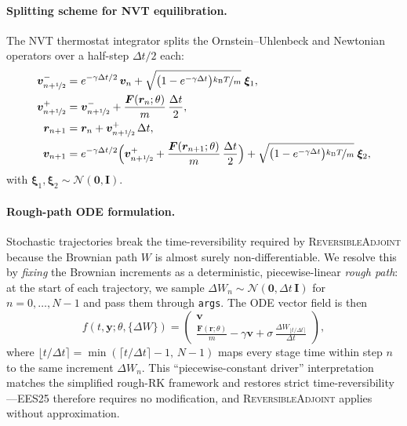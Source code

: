 \documentclass{article}
\newcommand{\kB}{k_{\mathrm{B}}}
\newcommand{\EES}{\textsc{EES25}}
\newcommand{\RevAdj}{\textsc{ReversibleAdjoint}}
\begin{document}
\paragraph{Splitting scheme for NVT equilibration.}
The NVT thermostat integrator splits the Ornstein--Uhlenbeck and Newtonian
operators over a half-step $\Delta t/2$ each:
\begin{align}
  \bm{v}_{n+\nicefrac{1}{2}}^- &= e^{-\gamma\Delta t/2}\,\bm{v}_n
    + \sqrt{\bigl(1-e^{-\gamma\Delta t}\bigr)\nicefrac{\kB T}{m}}\;\bm{\xi}_1, \\
  \bm{v}_{n+\nicefrac{1}{2}}^+ &= \bm{v}_{n+\nicefrac{1}{2}}^-
    + \frac{\bm{F}(\bm{r}_n;\theta)}{m}\,\frac{\Delta t}{2}, \\
  \bm{r}_{n+1} &= \bm{r}_n + \bm{v}_{n+\nicefrac{1}{2}}^+\,\Delta t, \\
  \bm{v}_{n+1} &= e^{-\gamma\Delta t/2}\Bigl(\bm{v}_{n+\nicefrac{1}{2}}^+
    + \frac{\bm{F}(\bm{r}_{n+1};\theta)}{m}\,\frac{\Delta t}{2}\Bigr)
    + \sqrt{\bigl(1-e^{-\gamma\Delta t}\bigr)\nicefrac{\kB T}{m}}\;\bm{\xi}_2,
\end{align}
with $\bm{\xi}_1, \bm{\xi}_2 \sim \mathcal{N}(\bm{0},\bm{I})$.

\paragraph{Rough-path ODE formulation.}
Stochastic trajectories break the time-reversibility required by \RevAdj{}
because the Brownian path $W$ is almost surely non-differentiable.  We resolve
this by \emph{fixing} the Brownian increments as a deterministic, piecewise-linear
\emph{rough path}: at the start of each trajectory, we sample
$\Delta W_n \sim \mathcal{N}(\bm{0}, \Delta t\,\bm{I})$ for
$n = 0, \ldots, N-1$ and pass them through \texttt{args}.  The ODE vector field is then
\begin{equation}
  \label{eq:roughpath}
  f(t,\bm{y};\theta,\{\Delta W\})
  = \begin{pmatrix}
      \bm{v} \\
      \displaystyle\frac{\bm{F}(\bm{r};\theta)}{m}
        - \gamma\bm{v}
        + \sigma\,\frac{\Delta W_{\lfloor t/\Delta t\rceil}}{\Delta t}
    \end{pmatrix},
\end{equation}
where $\lfloor t/\Delta t\rceil = \min(\lceil t/\Delta t\rceil - 1,\, N-1)$
maps every stage time within step $n$ to the same increment $\Delta W_n$.
This ``piecewise-constant driver'' interpretation matches the simplified
rough-RK framework \cite{foster2023} and restores strict
time-reversibility---\EES{} therefore requires no modification, and
\RevAdj{} applies without approximation.
\end{document}
